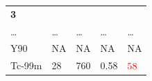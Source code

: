 \documentclass[]{book}
\theoremstyle{definition}
\theoremstyle{definition}
\theoremstyle{definition}
\theoremstyle{remark}
\begin{document}
\begin{longtable}[]{@{}lllll@{}}
\begin{minipage}[t]{0.13\columnwidth}
\textbf{3}\strut
\end{minipage}\tabularnewline
\begin{minipage}[t]{0.13\columnwidth}\raggedright\strut
\ldots{}\strut
\end{minipage} & \begin{minipage}[t]{0.13\columnwidth}\raggedright\strut
\ldots{}\strut
\end{minipage} & \begin{minipage}[t]{0.13\columnwidth}\raggedright\strut
\ldots{}\strut
\end{minipage} & \begin{minipage}[t]{0.13\columnwidth}\raggedright\strut
\ldots{}\strut
\end{minipage} & \begin{minipage}[t]{0.13\columnwidth}\raggedright\strut
\ldots{}\strut
\end{minipage}\tabularnewline
\begin{minipage}[t]{0.13\columnwidth}\raggedright\strut
Y90\strut
\end{minipage} & \begin{minipage}[t]{0.13\columnwidth}\raggedright\strut
NA\strut
\end{minipage} & \begin{minipage}[t]{0.13\columnwidth}\raggedright\strut
NA\strut
\end{minipage} & \begin{minipage}[t]{0.13\columnwidth}\raggedright\strut
NA\strut
\end{minipage} & \begin{minipage}[t]{0.13\columnwidth}\raggedright\strut
NA\strut
\end{minipage}\tabularnewline
\begin{minipage}[t]{0.13\columnwidth}\raggedright\strut
Tc-99m\strut
\end{minipage} & \begin{minipage}[t]{0.13\columnwidth}\raggedright\strut
28\strut
\end{minipage} & \begin{minipage}[t]{0.13\columnwidth}\raggedright\strut
760\strut
\end{minipage} & \begin{minipage}[t]{0.13\columnwidth}\raggedright\strut
0.58\strut
\end{minipage} & \begin{minipage}[t]{0.13\columnwidth}\raggedright\strut
\(\color{red} {58}\)\strut
\end{minipage}\tabularnewline
\bottomrule
\end{longtable}
\end{document}

